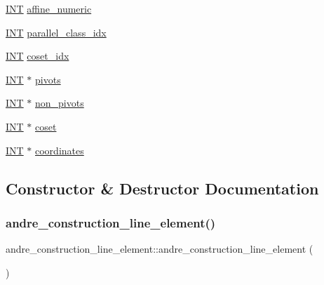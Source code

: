 \begin{DoxyCompactItemize}
\mbox{\hyperlink{galois_8h_a09fddde158a3a20bd2dcadb609de11dc}{I\+NT}} \mbox{\hyperlink{classandre__construction__line__element_aa1dd9a4b231dd3c9e12c9e4028428e5b}{affine\+\_\+numeric}}
\item 
\mbox{\hyperlink{galois_8h_a09fddde158a3a20bd2dcadb609de11dc}{I\+NT}} \mbox{\hyperlink{classandre__construction__line__element_a31ecafcef152eee2bb174b13049d58ea}{parallel\+\_\+class\+\_\+idx}}
\item 
\mbox{\hyperlink{galois_8h_a09fddde158a3a20bd2dcadb609de11dc}{I\+NT}} \mbox{\hyperlink{classandre__construction__line__element_acab90e2061180a9c1ef2c119851ee68c}{coset\+\_\+idx}}
\item 
\mbox{\hyperlink{galois_8h_a09fddde158a3a20bd2dcadb609de11dc}{I\+NT}} $\ast$ \mbox{\hyperlink{classandre__construction__line__element_a5e7351e4d73ace364835be596a7586a3}{pivots}}
\item 
\mbox{\hyperlink{galois_8h_a09fddde158a3a20bd2dcadb609de11dc}{I\+NT}} $\ast$ \mbox{\hyperlink{classandre__construction__line__element_a00639fe79d652650af5d59ed6e441d13}{non\+\_\+pivots}}
\item 
\mbox{\hyperlink{galois_8h_a09fddde158a3a20bd2dcadb609de11dc}{I\+NT}} $\ast$ \mbox{\hyperlink{classandre__construction__line__element_a0c96cc38dee5789109021f3340a0e766}{coset}}
\item 
\mbox{\hyperlink{galois_8h_a09fddde158a3a20bd2dcadb609de11dc}{I\+NT}} $\ast$ \mbox{\hyperlink{classandre__construction__line__element_a4834c9003d134780ce3cc58fed55a88f}{coordinates}}
\end{DoxyCompactItemize}


\subsection{Constructor \& Destructor Documentation}
\mbox{\label{classandre__construction__line__element_a09cd94d28949192bf710a279062441dc}} 
\subsubsection{\texorpdfstring{andre\+\_\+construction\+\_\+line\+\_\+element()}{andre\_construction\_line\_element()}}
{\footnotesize\ttfamily andre\+\_\+construction\+\_\+line\+\_\+element\+::andre\+\_\+construction\+\_\+line\+\_\+element (\begin{DoxyParamCaption}{ }\end{DoxyParamCaption})}

